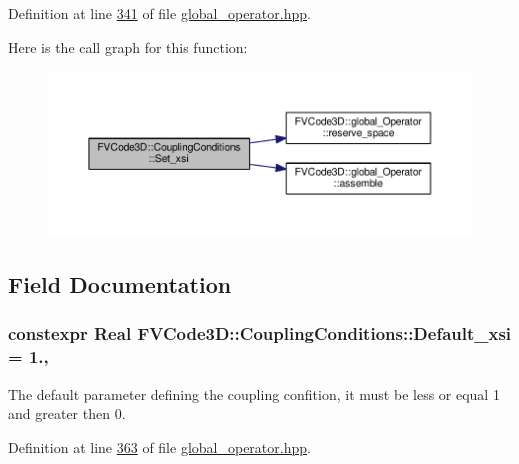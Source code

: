 Definition at line \hyperlink{global__operator_8hpp_source_l00341}{341} of file \hyperlink{global__operator_8hpp_source}{global\+\_\+operator.\+hpp}.



Here is the call graph for this function\+:
\nopagebreak
\begin{figure}[H]
\begin{center}
\leavevmode
\includegraphics[width=350pt]{classFVCode3D_1_1CouplingConditions_aae796c113f61442f57f7844cd2174b9c_cgraph}
\end{center}
\end{figure}




\subsection{Field Documentation}
\subsubsection[{\texorpdfstring{Default\+\_\+xsi}{Default_xsi}}]{\setlength{\rightskip}{0pt plus 5cm}constexpr {\bf Real} F\+V\+Code3\+D\+::\+Coupling\+Conditions\+::\+Default\+\_\+xsi = 1.\hspace{0.3cm}{\ttfamily [static]}, {\ttfamily [private]}}\hypertarget{classFVCode3D_1_1CouplingConditions_a65e0fbd0172c5322cfedd1d01d12e8a6}{}\label{classFVCode3D_1_1CouplingConditions_a65e0fbd0172c5322cfedd1d01d12e8a6}


The default parameter defining the coupling confition, it must be less or equal 1 and greater then 0. 



Definition at line \hyperlink{global__operator_8hpp_source_l00363}{363} of file \hyperlink{global__operator_8hpp_source}{global\+\_\+operator.\+hpp}.

